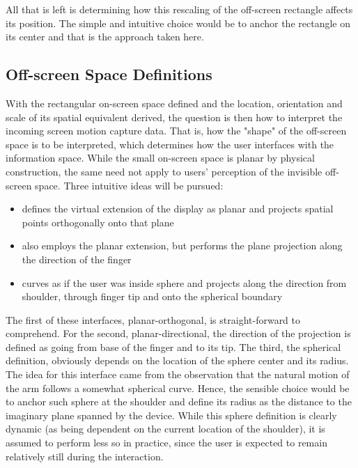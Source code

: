 All that is left is determining how this rescaling of the off-screen rectangle  affects its position. The simple and intuitive choice would be to  anchor the rectangle on its center and that is the approach taken here. 



\subsection{Off-screen Space Definitions}%

With the rectangular on-screen space defined and the location, orientation and scale of its spatial equivalent derived, the question is then how to interpret the incoming screen motion capture data. That is, how the "shape" of the off-screen space is to be interpreted, which determines how the user interfaces with the information space. While the small on-screen space is planar by physical construction, the same need not apply to users' perception of the invisible off-screen space. Three intuitive ideas will be pursued:

\begin{itemize}
	\item {} defines the virtual extension of the display as planar and projects spatial points orthogonally onto that plane
	\item {} also employs the planar extension, but performs the plane projection along the direction of the finger
	\item {} curves as if the user was inside sphere and projects along the direction from shoulder, through finger tip and onto the spherical boundary
\end{itemize}

The first of these interfaces, planar-orthogonal, is straight-forward to comprehend. For the second, planar-directional, the direction of the projection is defined as going from base of the finger and to its tip. The third, the spherical definition, obviously depends on the location of the sphere center and its radius. The idea for this interface came from the observation that the natural motion of the arm follows a somewhat spherical curve. Hence, the sensible choice would be to anchor such sphere at the shoulder and define its radius as the distance to the imaginary plane spanned by the device. While this sphere definition is clearly dynamic (as being dependent on the current location of the shoulder), it is assumed to perform less so in practice, since the user is expected to remain relatively still during the interaction. 


